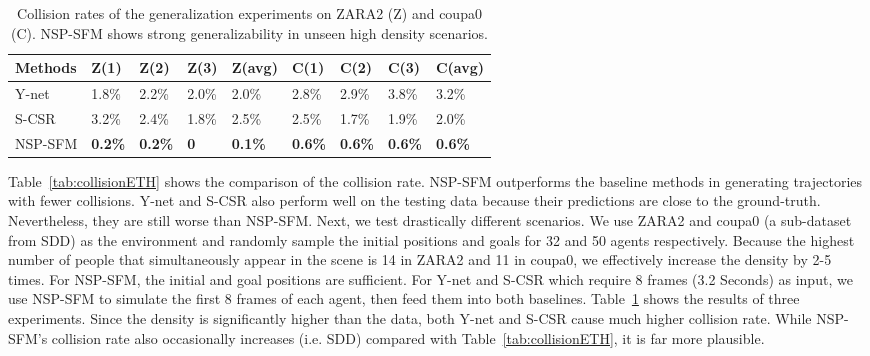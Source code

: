 \documentclass[runningheads]{llncs}
\newcommand{\Tabref}[1]{Table~\ref{tab:#1}}
\begin{document}
\begin{table}[tb]
\scriptsize 
\begin{center}
\caption{Collision rates of the generalization experiments on ZARA2 (Z) and coupa0 (C). NSP-SFM shows strong generalizability in unseen high density scenarios.}
\begin{tabular}{ |p{1.3cm}||p{1cm}|p{1cm}|p{1cm}|p{1.2cm}||p{1cm}|p{1cm}|p{1cm}| p{1.2cm}| }
 \hline
 Methods& Z(1) & Z(2) & Z(3) & Z(avg)& C(1) & C(2) & C(3)& C(avg)\\
 \hline
 Y-net  & 1.8\% & 2.2\% & 2.0\% &  2.0\% & 2.8\% & 2.9\% & 3.8\%& 3.2\% \\
 S-CSR  & 3.2\% & 2.4\% & 1.8\% & 2.5\%  & 2.5\% & 1.7\% & 1.9\% & 2.0\% \\
 NSP-SFM  & \textbf{0.2\%} & \textbf{0.2\%} & \textbf{0} & \textbf{0.1\%}  & \textbf{0.6\%} & \textbf{0.6\%} & \textbf{0.6\%} & \textbf{0.6\%} \\
 \hline
\end{tabular}
\label{tab:collisionSim}
\end{center}
\end{table}

\Tabref{collisionETH} shows the comparison of the collision rate. NSP-SFM outperforms the baseline methods in generating trajectories with fewer collisions. Y-net and S-CSR also perform well on the testing data because their predictions are close to the ground-truth. Nevertheless, they are still worse than NSP-SFM. Next, we test drastically different scenarios. We use ZARA2 and coupa0 (a sub-dataset from SDD) as the environment and randomly sample the initial positions and goals for 32 and 50 agents respectively. Because the highest number of people that simultaneously appear in the scene is 14 in ZARA2 and 11 in coupa0, we effectively increase the density by 2-5 times. For NSP-SFM, the initial and goal positions are sufficient. For Y-net and S-CSR which require 8 frames (3.2 Seconds) as input, we use NSP-SFM to simulate the first 8 frames of each agent, then feed them into both baselines. \Tabref{collisionSim} shows the results of three experiments. Since the density is significantly higher than the data, both Y-net and S-CSR cause much higher collision rate. While NSP-SFM's collision rate also occasionally increases (i.e. SDD) compared with \Tabref{collisionETH}, it is far more plausible.
\end{document}

